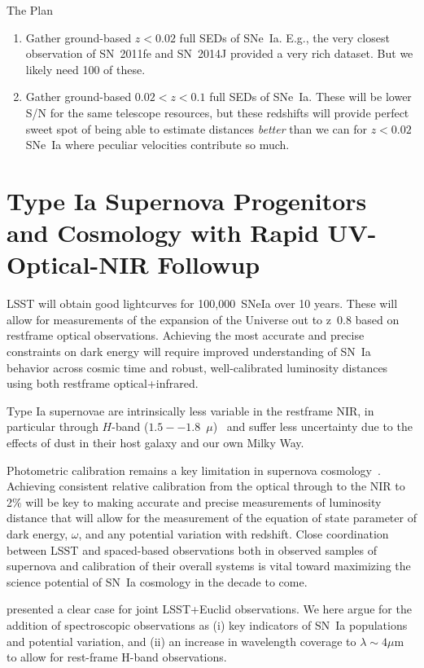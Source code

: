 \documentclass[12pt,preprint]{aastex}
\newcommand{\sneia}{SNe~Ia\xspace}
\begin{document}
The Plan
\begin{enumerate}
    \item Gather ground-based $z<0.02$ full SEDs of \sneia.  E.g., the very closest observation of SN~2011fe and SN~2014J provided a very rich dataset.  But we likely need 100 of these.
    \item Gather ground-based $0.02<z<0.1$ full SEDs of \sneia.  These will be lower S/N for the same telescope resources, but these redshifts will provide perfect sweet spot of being able to estimate distances {\em better} than we can for $z<0.02$ \sneia where peculiar velocities contribute so much.
\end{enumerate}
\fi

\section{Type Ia Supernova Progenitors and Cosmology with Rapid UV-Optical-NIR Followup}

LSST will obtain good lightcurves for 100,000~SNeIa over 10 years.  These will allow for measurements of the expansion of the Universe out to z~0.8 based on restframe optical observations.  Achieving the most accurate and precise constraints on dark energy will require improved understanding of SN~Ia behavior across cosmic time and robust, well-calibrated luminosity distances using both restframe optical+infrared.

Type Ia supernovae are intrinsically less variable in the restframe NIR, in particular through $H$-band ($1.5--1.8$~$\mu$)~\citep{Krisciunas04a, Krisciunas04b, Krisciunas04c, Wood-Vasey08, Contreras10, Stritzinger11, Kattner12} and suffer less uncertainty due to the effects of dust in their host galaxy and our own Milky Way.

Photometric calibration remains a key limitation in supernova cosmology~\citep{Scolnic18}.  Achieving consistent relative calibration from the optical through to the NIR to 2\% will be key to making accurate and precise measurements of luminosity distance that will allow for the measurement of the equation of state parameter of dark energy, $\omega$, and any potential variation with redshift.  Close coordination between LSST and spaced-based observations both in observed samples of supernova and calibration of their overall systems is vital toward maximizing the science potential of SN~Ia cosmology in the decade to come. 

\citet{Astier14} presented a clear case for joint LSST+Euclid observations.  We here argue for the addition of spectroscopic observations as (i) key indicators of SN~Ia populations and potential variation, and (ii) an increase in wavelength coverage to $\lambda\sim4\mu$m to allow for rest-frame H-band observations.
\end{document}
